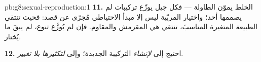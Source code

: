 \begin{solution}{pb:g8:sexual-reproduction:1}
\textbf{11.} الخلط يموّن الطاولة --- فكل جيل يوزّع تركيبات لم
يصممها أحد؛ واختيار المربّية ليس إلا مبدأ الاحتياطي مُجرًى عن قصد:
فحيث تنتقي  الطبيعة المتغيرة المناسبَ، تنتقي هي المقرمش
والمقاوم. فإن لم يُوزَّع تنوع، لم يبقَ ما يُختار.

\textbf{12.} احتيج إلى  \emph{لإنشاء} التركيبة
الجديدة؛ وإلى  \emph{لتكثيرها بلا تغيير}.
\end{solution}
